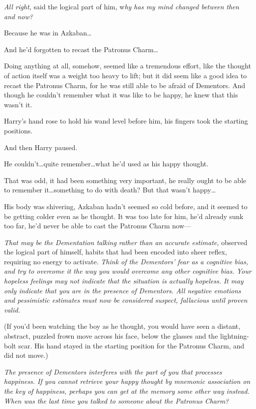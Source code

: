 \emph{All right,} said the logical part of him, w\emph{hy has my mind changed
between then and now?}

Because he was in Azkaban…

And he'd forgotten to recast the Patronus Charm…

Doing anything at all, somehow, seemed like a tremendous effort, like the
thought of action itself was a weight too heavy to lift; but it did seem like a
good idea to recast the Patronus Charm, for he was still able to be afraid of
Dementors. And though he couldn't remember what it was like to be happy, he
knew that this wasn't it.

Harry's hand rose to hold his wand level before him, his fingers took the
starting positions.

And then Harry paused.

He couldn't…quite remember…what he'd used as his happy thought.

That was odd, it had been something very important, he really ought to be able
to remember it…something to do with death? But that wasn't happy…

His body was shivering, Azkaban hadn't seemed so cold before, and it seemed to
be getting colder even as he thought. It was too late for him, he'd already
sunk too far, he'd never be able to cast the Patronus Charm now—

\emph{That may be the Dementation talking rather than an accurate estimate,}
observed the logical part of himself, habits that had been encoded into sheer
reflex, requiring no energy to activate. \emph{Think of the Dementors' fear as
a cognitive bias, and try to overcome it the way you would overcome any other
cognitive bias. Your hopeless feelings may not indicate that the situation is
actually hopeless. It may only indicate that you are in the presence of
Dementors. All negative emotions and pessimistic estimates must now be
considered suspect, fallacious until proven valid.}

(If you'd been watching the boy as he thought, you would have seen a distant,
abstract, puzzled frown move across his face, below the glasses and the
lightning-bolt scar. His hand stayed in the starting position for the Patronus
Charm, and did not move.)

\emph{The presence of Dementors interferes with the part of you that processes
happiness. If you cannot retrieve your happy thought by mnemonic association on
the key of happiness, perhaps you can get at the memory some other way instead.
When was the last time you talked to someone about the Patronus Charm?}

